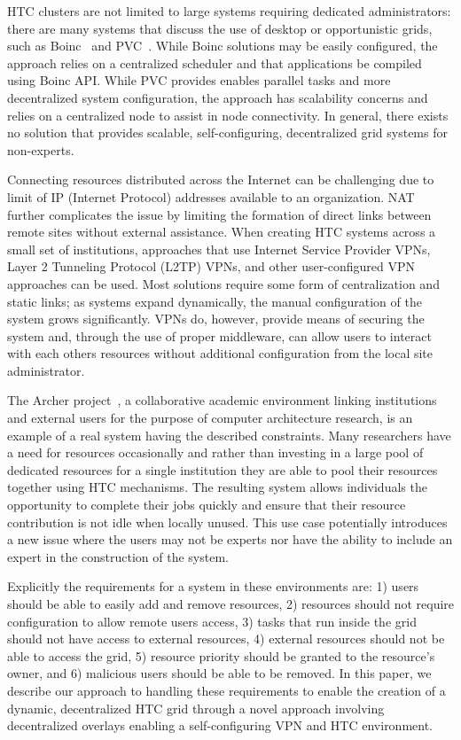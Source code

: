 \documentclass{sig-alternate}
\begin{document}
HTC clusters are not limited to large systems requiring dedicated
administrators: there are many systems that discuss the use of desktop or
opportunistic grids, such as Boinc~\cite{boinc} and PVC~\cite{pvc}.  While Boinc
solutions may be easily configured, the approach relies on a centralized
scheduler and that applications be compiled using Boinc API.  While PVC
provides enables parallel tasks and more decentralized system configuration,
the approach has scalability concerns and relies on a centralized node to
assist in node connectivity.  In general, there exists no solution that
provides scalable, self-configuring, decentralized grid systems for non-experts.

Connecting resources distributed across the Internet can be challenging due to
limit of IP (Internet Protocol) addresses available to an organization.  NAT
further complicates the issue by limiting the formation of direct links between
remote sites without external assistance.  When creating HTC systems across a
small set of institutions, approaches that use Internet Service Provider VPNs,
Layer 2 Tunneling Protocol (L2TP) VPNs, and other user-configured VPN
approaches can be used.  Most solutions require some form of centralization
and static links; as systems expand dynamically, the manual configuration of
the system grows significantly.  VPNs do, however, provide means of securing
the system and, through the use of proper middleware, can allow users to
interact with each others resources without additional configuration from the
local site administrator.

The Archer project~\cite{archer}, a collaborative academic environment
linking institutions and external users for the purpose of computer architecture
research, is an example of a real system having the described constraints.  Many
researchers have a need for resources occasionally and rather than investing
in a large pool of dedicated resources for a single institution they are able
to pool their resources together using HTC mechanisms.  The resulting system
allows individuals the opportunity to complete their jobs quickly and ensure
that their resource contribution is not idle when locally unused.  This use
case potentially introduces a new issue where the users may not be experts nor
have the ability to include an expert in the construction of the system.

Explicitly the requirements for a system in these environments are: 1) users
should be able to easily add and remove resources, 2) resources should not
require configuration to allow remote users access, 3) tasks that run inside
the grid should not have access to external resources, 4) external resources
should not be able to access the grid, 5) resource priority should be granted
to the resource's owner, and 6) malicious users should be able to be removed.
In this paper, we describe our approach to handling these requirements to
enable the creation of a dynamic, decentralized HTC grid through a novel
approach involving decentralized overlays enabling a self-configuring VPN
and HTC environment.  
\end{document}
